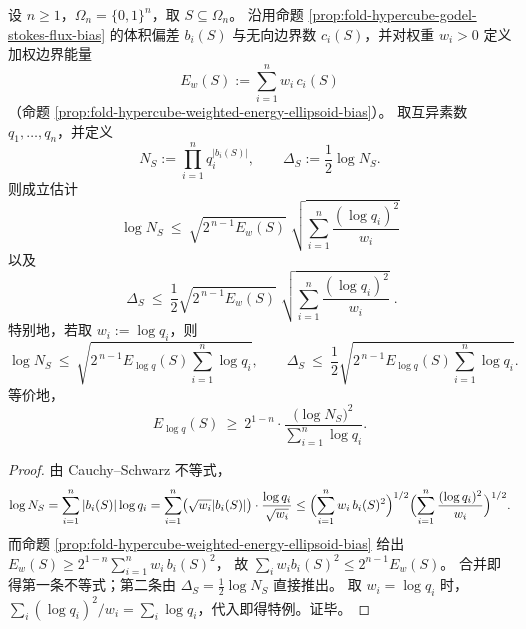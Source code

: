 
\begin{theorem}\label{thm:fold-hypercube-godel-length-energy-upperbound}
设 \(n\ge 1\)，\(\Omega_n=\{0,1\}^n\)，取 \(S\subseteq\Omega_n\)。
沿用命题 \ref{prop:fold-hypercube-godel-stokes-flux-bias} 的体积偏差 \(b_i(S)\) 与无向边界数 \(c_i(S)\)，并对权重 \(w_i>0\) 定义加权边界能量
\[
E_w(S):=\sum_{i=1}^n w_i\,c_i(S)
\]
（命题 \ref{prop:fold-hypercube-weighted-energy-ellipsoid-bias}）。
取互异素数 \(q_1,\dots,q_n\)，并定义
\[
N_S:=\prod_{i=1}^n q_i^{|b_i(S)|},\qquad
\Delta_S:=\frac12\log N_S.
\]
则成立估计
\[
\boxed{\;
\log N_S\ \le\ \sqrt{2^{\,n-1}E_w(S)}\;\sqrt{\sum_{i=1}^n \frac{(\log q_i)^2}{w_i}}\;}
\]
以及
\[
\boxed{\;
\Delta_S\ \le\ \frac12\sqrt{2^{\,n-1}E_w(S)}\;\sqrt{\sum_{i=1}^n \frac{(\log q_i)^2}{w_i}}\; }.
\]
特别地，若取 \(w_i:=\log q_i\)，则
\[
\log N_S\ \le\ \sqrt{2^{\,n-1}E_{\log q}(S)\sum_{i=1}^n \log q_i},
\qquad
\Delta_S\ \le\ \frac12\sqrt{2^{\,n-1}E_{\log q}(S)\sum_{i=1}^n \log q_i}.
\]
等价地，
\[
E_{\log q}(S)\ \ge\
2^{1-n}\cdot \frac{\bigl(\log N_S\bigr)^2}{\sum_{i=1}^n \log q_i}.
\]
\end{theorem}

\begin{proof}
由 Cauchy--Schwarz 不等式，
\[
\log N_S=\sum_{i=1}^n |b_i(S)|\log q_i
=\sum_{i=1}^n \bigl(\sqrt{w_i}|b_i(S)|\bigr)\cdot\frac{\log q_i}{\sqrt{w_i}}
\le
\Bigl(\sum_{i=1}^n w_i\,b_i(S)^2\Bigr)^{1/2}
\Bigl(\sum_{i=1}^n \frac{(\log q_i)^2}{w_i}\Bigr)^{1/2}.
\]
而命题 \ref{prop:fold-hypercube-weighted-energy-ellipsoid-bias} 给出
\(
E_w(S)\ge 2^{1-n}\sum_{i=1}^n w_i\,b_i(S)^2
\)，
故 \(\sum_i w_i b_i(S)^2\le 2^{n-1}E_w(S)\)。
合并即得第一条不等式；第二条由 \(\Delta_S=\tfrac12\log N_S\) 直接推出。
取 \(w_i=\log q_i\) 时，\(\sum_i (\log q_i)^2/w_i=\sum_i\log q_i\)，代入即得特例。证毕。
\end{proof}

\endinput
